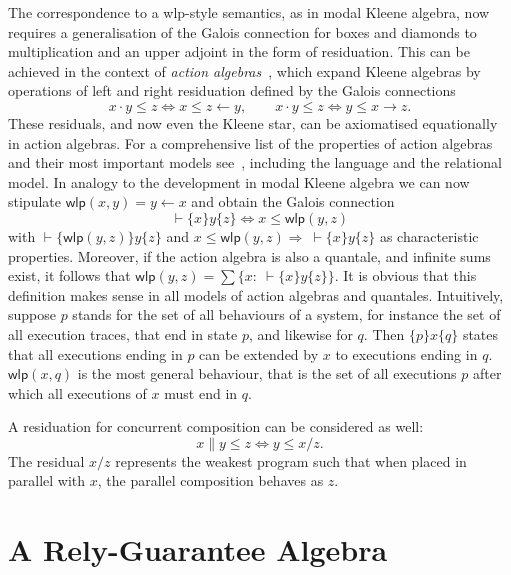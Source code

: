 \documentclass{llncs}
\newcommand{\wlp}{\mathsf{wlp}}
\begin{document}
The correspondence to a wlp-style semantics, as in modal Kleene
algebra, now requires a generalisation of the Galois connection for
boxes and diamonds to multiplication and an upper adjoint in the form
of residuation.  This can be achieved in the context of \emph{action
  algebras}~\cite{pratt_action_1990}, which expand Kleene algebras by operations
of left and right residuation defined by the Galois connections
\begin{equation*}
  x\cdot y\le z\Leftrightarrow x\le z\leftarrow y,\qquad x\cdot y\le z \Leftrightarrow y\le x\rightarrow z.
\end{equation*}
These residuals, and now even the Kleene star, can be axiomatised
equationally in action algebras. For a comprehensive list of the
properties of action algebras and their most important models
see~\cite{armstrong_kleene_2013}, including the language and the relational
model. In analogy to the development in modal Kleene algebra we can
now stipulate $ \wlp(x,y)=y\leftarrow x$ and obtain the Galois
connection
\begin{equation*}
  \vdash \{x\}y\{z\} \Leftrightarrow x\le \wlp(y,z)
\end{equation*}
with $\vdash \{\wlp(y,z)\}y\{z\}$ and $x\le \wlp(y,z)\Rightarrow \
\vdash \{x\}y\{z\}$ as characteristic properties. Moreover, if the
action algebra is also a quantale, and infinite sums exist, it follows
that $ \wlp(y,z)=\sum\{x:\ \vdash \{x\}y\{z\}\}$.  It is obvious that
this definition makes sense in all models of action algebras and
quantales. Intuitively, suppose $p$ stands for the set of all
behaviours of a system, for instance the set of all execution traces,
that end in state $p$, and likewise for $q$. Then $\{p\}x\{q\}$ states
that all executions ending in $p$ can be extended by $x$ to executions
ending in $q$. $\wlp(x,q)$ is the most general behaviour, that is the
set of all executions $p$ after which all executions of $x$ must end
in $q$.

A residuation for concurrent composition can be considered as well:
\begin{equation*}
x\|y \le z \Leftrightarrow y \le x/z.
\end{equation*}
The residual $x/z$ represents the weakest program such that when
placed in parallel with $x$, the parallel composition behaves as $z$.



\section{A  Rely-Guarantee Algebra}
\label{sec:RG}
\end{document}
